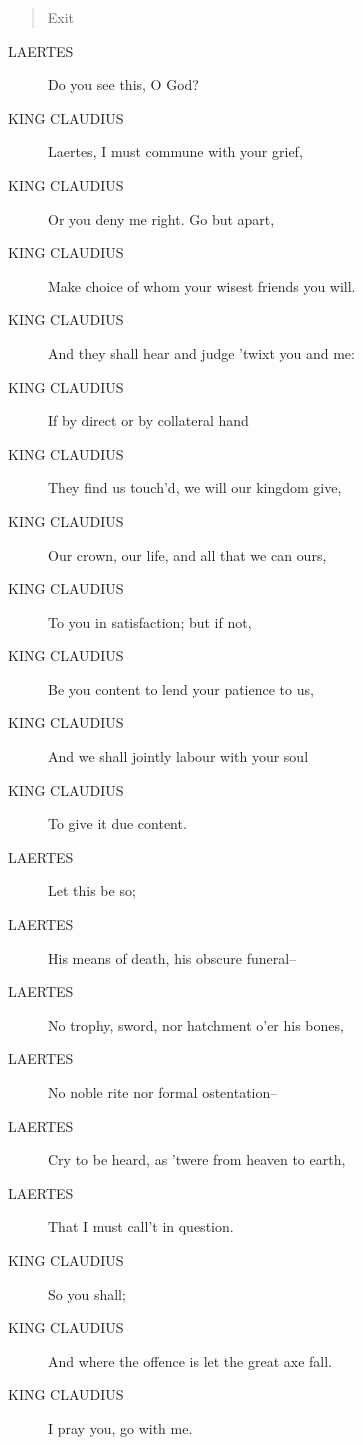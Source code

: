 \documentclass{article}
\begin{document}
\begin{quote}
Exit
\end{quote}
          
\begin{description}
            
\item[LAERTES] Do you see this, O God?
\end{description}
          
\begin{description}
            
\item[KING CLAUDIUS] Laertes, I must commune with your grief,
\item[KING CLAUDIUS] Or you deny me right. Go but apart,
\item[KING CLAUDIUS] Make choice of whom your wisest friends you will.
\item[KING CLAUDIUS] And they shall hear and judge 'twixt you and me:
\item[KING CLAUDIUS] If by direct or by collateral hand
\item[KING CLAUDIUS] They find us touch'd, we will our kingdom give,
\item[KING CLAUDIUS] Our crown, our life, and all that we can ours,
\item[KING CLAUDIUS] To you in satisfaction; but if not,
\item[KING CLAUDIUS] Be you content to lend your patience to us,
\item[KING CLAUDIUS] And we shall jointly labour with your soul
\item[KING CLAUDIUS] To give it due content.
\end{description}
          
\begin{description}
            
\item[LAERTES] Let this be so;
\item[LAERTES] His means of death, his obscure funeral--
\item[LAERTES] No trophy, sword, nor hatchment o'er his bones,
\item[LAERTES] No noble rite nor formal ostentation--
\item[LAERTES] Cry to be heard, as 'twere from heaven to earth,
\item[LAERTES] That I must call't in question.
\end{description}
          
\begin{description}
            
\item[KING CLAUDIUS] So you shall;
\item[KING CLAUDIUS] And where the offence is let the great axe fall.
\item[KING CLAUDIUS] I pray you, go with me.
\end{description}
          
\end{document}
